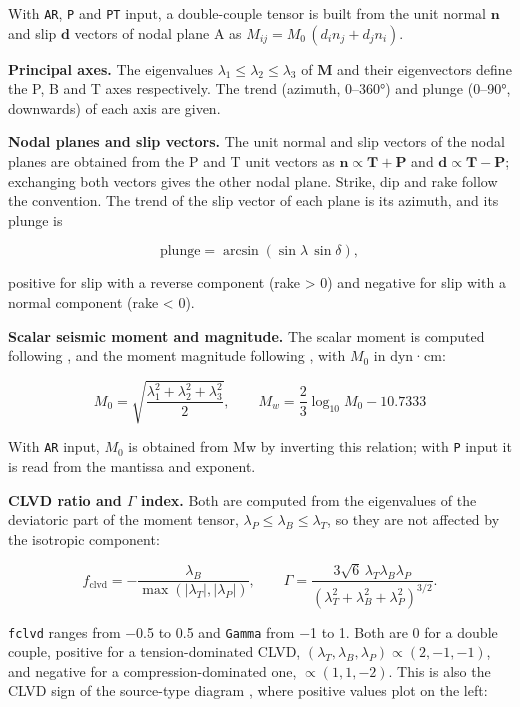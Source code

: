 \documentclass[11pt,a4paper,english]{article}
\numberwithin{equation}{section}
\begin{document}
With \texttt{AR}, \texttt{P} and \texttt{PT} input, a double-couple tensor is built from the unit
normal \(\mathbf{n}\) and slip \(\mathbf{d}\) vectors of nodal plane A as
\(M_{ij} = M_0\,(d_i n_j + d_j n_i)\).

\textbf{Principal axes.} The eigenvalues \(\lambda_1 \le \lambda_2 \le \lambda_3\) of \(\mathbf{M}\)
and their eigenvectors define the P, B and T axes respectively. The trend (azimuth, 0--360°) and
plunge (0--90°, downwards) of each axis are given.

\textbf{Nodal planes and slip vectors.} The unit normal and slip vectors of the nodal planes are
obtained from the P and T unit vectors as \(\mathbf{n} \propto \mathbf{T}+\mathbf{P}\) and
\(\mathbf{d} \propto \mathbf{T}-\mathbf{P}\); exchanging both vectors gives the other nodal plane.
Strike, dip and rake follow the \citet{aki80} convention. The trend of the slip vector of each plane
is its azimuth, and its plunge is

\[
\text{plunge} = \arcsin(\sin\lambda\,\sin\delta),
\]

positive for slip with a reverse component (rake \textgreater{} 0) and negative for slip with a
normal component (rake \textless{} 0).

\textbf{Scalar seismic moment and magnitude.} The scalar moment is computed following
\citet{silv82}, and the moment magnitude following \citet{hank79}, with \(M_0\) in dyn·cm:

\[
M_0 = \sqrt{\frac{\lambda_1^2+\lambda_2^2+\lambda_3^2}{2}}, \qquad M_w = \frac{2}{3}\log_{10} M_0 - 10.7333
\]

With \texttt{AR} input, \(M_0\) is obtained from Mw by inverting this relation; with \texttt{P}
input it is read from the mantissa and exponent.

\textbf{CLVD ratio and \(\Gamma\) index.} Both are computed from the eigenvalues of the deviatoric
part of the moment tensor, \(\lambda_P \le \lambda_B \le \lambda_T\), so they are not affected by
the isotropic component:

\[
f_{\mathrm{clvd}} = -\frac{\lambda_B}{\max\left(\lvert\lambda_T\rvert, \lvert\lambda_P\rvert\right)}, \qquad
\Gamma = \frac{3\sqrt{6}\,\lambda_T\lambda_B\lambda_P}{\left(\lambda_T^2+\lambda_B^2+\lambda_P^2\right)^{3/2}} .
\]

\texttt{fclvd} \citep{froh99} ranges from −0.5 to 0.5 and \texttt{Gamma} \citep{kaga85} from −1 to
1. Both are 0 for a double couple, positive for a tension-dominated CLVD,
\((\lambda_T,\lambda_B,\lambda_P)\propto(2,-1,-1)\), and negative for a compression-dominated one,
\(\propto(1,1,-2)\). This is also the CLVD sign of the source-type diagram \citep{huds89,vavr15},
where positive values plot on the left:
\end{document}
